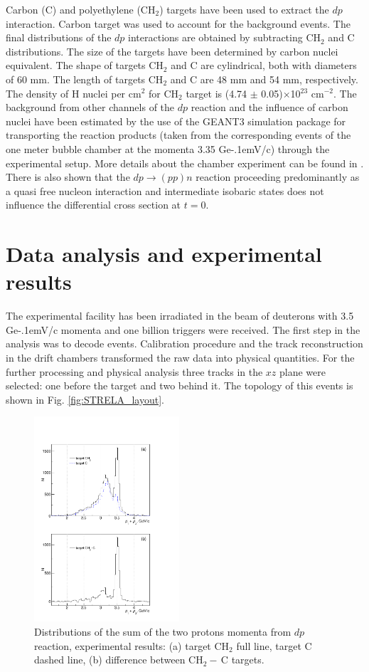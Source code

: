 \documentclass[twocolumn,epjc3]{svjour3}
\newcommand{\dpchex} {\ensuremath{dp \rightarrow (pp)n}\xspace}
\newcommand{\GeVc}   {Ge\kern-.1emV/c\xspace}
\begin{document}
Carbon (C) and polyethylene (CH$_2$) targets have been used to extract the $dp$
interaction. Carbon target was used to account for the background events. The
final distributions of the $dp$ interactions are obtained by subtracting CH$_2$
and C distributions. The size of the targets have been determined by carbon
nuclei equivalent. The shape of targets CH$_2$ and C are cylindrical, both with
diameters of 60 mm. The length of targets CH$_2$ and C are 48 mm and 54 mm,
respectively. The density of H nuclei per cm$^2$ for CH$_2$ target is (4.74
$\pm$ 0.05)$\times$10$^{23}$ cm$^{-2}$. The background from other channels of
the $dp$ reaction and the influence of carbon nuclei have been estimated by the
use of the GEANT3 simulation package for transporting the reaction products
(taken from the corresponding events of the one meter bubble chamber at the
momenta 3.35 \GeVc) through the experimental setup. More details about the
chamber experiment can be found in \cite{gla02,gla08}. There is also shown that
the \dpchex reaction proceeding predominantly as a quasi free nucleon
interaction and intermediate isobaric states does not influence the differential
cross section at $t = 0$.

\section{Data analysis and experimental results}
The experimental facility has been irradiated in the beam of deuterons with 3.5
\GeVc momenta and one billion triggers were received.
The first step in the analysis was to decode events. Calibration procedure and
the track reconstruction in the drift chambers transformed the raw data into
physical quantities. For the further processing and physical analysis three
tracks in the $xz$ plane were selected: one before the target and two behind it.
The topology of this events is shown in Fig. \ref{fig:STRELA_layout}.

\begin{figure}[h]
  \centering
  \includegraphics[width=0.48\textwidth]{p1_plus_p2_1.pdf}
  \caption{Distributions of the sum of the two protons momenta from $dp$
    reaction, experimental results: (a) target CH$_2$ full line, target C dashed
    line, (b) difference between CH$_2-$\,C targets.}
  \label{fig:p1p2exp}
\end{figure}
\end{document}
